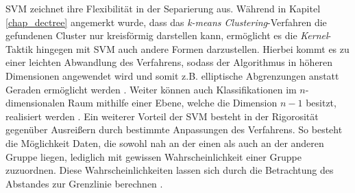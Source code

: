 SVM zeichnet ihre Flexibilität in der Separierung aus. Während in Kapitel \ref{chap_dectree} angemerkt wurde, dass das \emph{k-means Clustering}-Verfahren die gefundenen Cluster nur kreisförmig darstellen kann, ermöglicht es die \emph{Kernel}-Taktik hingegen mit SVM auch andere Formen darzustellen. Hierbei kommt es zu einer leichten Abwandlung des Verfahrens, sodass der Algorithmus in höheren Dimensionen angewendet wird und somit z.B. elliptische Abgrenzungen anstatt Geraden ermöglicht werden \cite{Ng.2018}. Weiter können auch Klassifikationen im $n$-dimensionalen Raum mithilfe einer Ebene, welche die Dimension $n-1$ besitzt, realisiert werden \cite{Cleve.2020}. Ein weiterer Vorteil der SVM besteht in der Rigorosität gegenüber Ausreißern durch bestimmte Anpassungen des Verfahrens. So besteht die Möglichkeit Daten, die sowohl nah an der einen als auch an der anderen Gruppe liegen, lediglich mit gewissen Wahrscheinlichkeit einer Gruppe zuzuordnen. Diese Wahrscheinlichkeiten lassen sich durch die Betrachtung des Abstandes zur Grenzlinie berechnen \cite{Ng.2018}.

